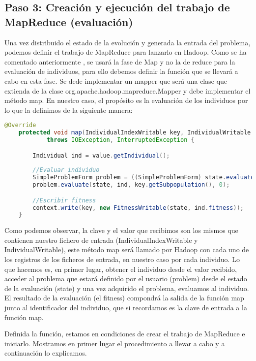 \subsection{Paso 3: Creación y ejecución del trabajo de MapReduce (evaluación)}

Una vez distribuido el estado de la evolución y generada la entrada del problema, podemos definir el trabajo de MapReduce para lanzarlo en Hadoop. Como se ha comentado anteriormente , se usar\'a la fase de Map y no la de reduce para la evaluación de individuos, para ello debemos definir la función que se llevar\'a a cabo en esta fase. Se dede implementar un mapper que ser\'a una clase que extienda de la clase org.apache.hadoop.mapreduce.Mapper y debe implementar el método map. En nuestro caso, el propósito es la evaluación de los individuos por lo que la definimos de la siguiente manera:

\begin{lstlisting}[language=Java]
	@Override
	protected void map(IndividualIndexWritable key, IndividualWritable value, Context context)
			throws IOException, InterruptedException {

		Individual ind = value.getIndividual();
		
		//Evaluar individuo
		SimpleProblemForm problem = ((SimpleProblemForm) state.evaluator.p_problem);
		problem.evaluate(state, ind, key.getSubpopulation(), 0);

		//Escribir fitness
		context.write(key, new FitnessWritable(state, ind.fitness));
	}
\end{lstlisting}

Como podemos observar, la clave y el valor que recibimos son los mismos que contienen nuestro fichero de entrada (IndividualIndexWritable y IndividualWritable), este método map ser\'a llamado por Hadoop con cada uno de los registros de los ficheros de entrada, en nuestro caso por cada individuo. Lo que hacemos es, en primer lugar, obtener el individuo desde el valor recibido, acceder al problema que estará definido por el usuario (problem) desde el estado de la evaluación (state) y una vez adquirido el problema, evaluamos al individuo. El resultado de la evaluación (el fitness) compondrá la salida de la función map junto al identificador del individuo, que si recordamos es la clave de entrada a la función map.

Definida la función, estamos en condiciones de crear el trabajo de MapReduce e iniciarlo. Mostramos en primer lugar el procedimiento a llevar a cabo y a continuación lo explicamos.

